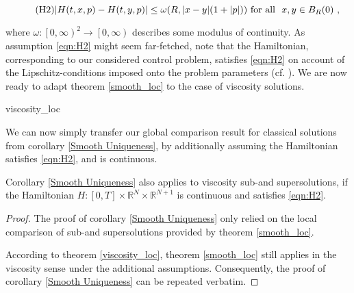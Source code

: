 		  \begin{equation}
		  	\tag{H2}
		  	\lvert H(t, x, p) - H(t, y, p) \rvert \leq \omega(R, \lvert x - y \rvert (1 + \lvert p \rvert)) \hbox{ for all } \ x, y \in B_R(0) \ ,
		  	\label{eqn:H2}
		  \end{equation}
		  
		  where $ \omega : \left[0, \infty \right)^2 \to \left[0, \infty \right) $ describes some modulus of continuity. As assumption \eqref{eqn:H2} 
		  might seem far-fetched, note that the Hamiltonian, corresponding to our considered control problem, satisfies \eqref{eqn:H2} on account of the Lipschitz-conditions imposed onto the problem parameters (cf. \cite[p.~167]{zhou}). We are now ready to adapt theorem \ref{smooth_loc} to the case of viscosity solutions.
		  
		  {viscosity_loc}
		  
		  We can now simply transfer our global comparison result for classical solutions from corollary \ref{Smooth Uniqueness}, by additionally assuming the Hamiltonian satisfies \eqref{eqn:H2}, and is continuous.
		  
		  \begin{corollary}
		  	Corollary \ref{Smooth Uniqueness} also applies to viscosity sub-and supersolutions, if the Hamiltonian $ H : \left[ 0, T \right] \times \mathbb{R}^{N} \times \mathbb{R}^{N+1} $ is continuous and satisfies \eqref{eqn:H2}.
		  	
		  	\begin{proof}
		  		The proof of corollary \ref{Smooth Uniqueness} only relied on the local comparison of sub-and supersolutions provided by theorem \ref{smooth_loc}. 
		  		
		  		According to theorem \ref{viscosity_loc}, theorem \ref{smooth_loc} still applies in the viscosity sense under the additional assumptions. Consequently, the proof of corollary \ref{Smooth Uniqueness} can be repeated verbatim.
		  	\end{proof}
		  \end{corollary}
		  